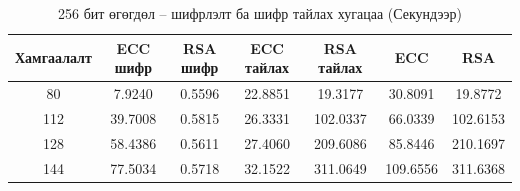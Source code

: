 \begin{table}
	\centering
	\caption{256 бит өгөгдөл – шифрлэлт ба шифр тайлах хугацаа (Секундээр) \cite{RSAvsECC}}
	\begin{tabular}{|c|c|c|c|c|c|c|}
		\hline
		Хамгаалалт & ECC шифр & RSA шифр & ECC тайлах & RSA тайлах & ECC      & RSA      \\
		\hline
		80         & 7.9240   & 0.5596   & 22.8851    & 19.3177    & 30.8091  & 19.8772  \\
		112        & 39.7008  & 0.5815   & 26.3331    & 102.0337   & 66.0339  & 102.6153 \\
		128        & 58.4386  & 0.5611   & 27.4060    & 209.6086   & 85.8446  & 210.1697 \\
		144        & 77.5034  & 0.5718   & 32.1522    & 311.0649   & 109.6556 & 311.6368 \\
		\hline
	\end{tabular}
\end{table}


